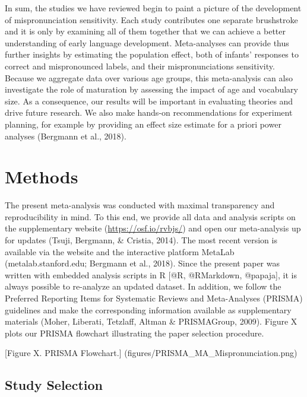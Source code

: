 \documentclass[man]{apa6}
\theoremstyle{definition}
\theoremstyle{definition}
\theoremstyle{definition}
\theoremstyle{remark}
\begin{document}
In sum, the studies we have reviewed begin to paint a picture of the
development of mispronunciation sensitivity. Each study contributes one
separate brushstroke and it is only by examining all of them together
that we can achieve a better understanding of early language
development. Meta-analyses can provide thus further insights by
estimating the population effect, both of infants' responses to correct
and mispronounced labels, and their mispronunciations sensitivity.
Because we aggregate data over various age groups, this meta-analysis
can also investigate the role of maturation by assessing the impact of
age and vocabulary size. As a consequence, our results will be important
in evaluating theories and drive future research. We also make hands-on
recommendations for experiment planning, for example by providing an
effect size estimate for a priori power analyses (Bergmann et al.,
2018).

\section{Methods}\label{methods}

The present meta-analysis was conducted with maximal transparency and
reproducibility in mind. To this end, we provide all data and analysis
scripts on the supplementary website (\url{https://osf.io/rvbjs/}) and
open our meta-analysis up for updates (Tsuji, Bergmann, \& Cristia,
2014). The most recent version is available via the website and the
interactive platform MetaLab (metalab.stanford.edu; Bergmann et al.,
2018). Since the present paper was written with embedded analysis
scripts in R {[}@R, @RMarkdown, @papaja{]}, it is always possible to
re-analyze an updated dataset. In addition, we follow the Preferred
Reporting Items for Systematic Reviews and Meta-Analyses (PRISMA)
guidelines and make the corresponding information available as
supplementary materials (Moher, Liberati, Tetzlaff, Altman \&
PRISMAGroup, 2009). Figure X plots our PRISMA flowchart illustrating the
paper selection procedure.

{[}Figure X. PRISMA Flowchart.{]}
(figures/PRISMA\_MA\_Mispronunciation.png)

\subsection{Study Selection}\label{study-selection}
\end{document}
